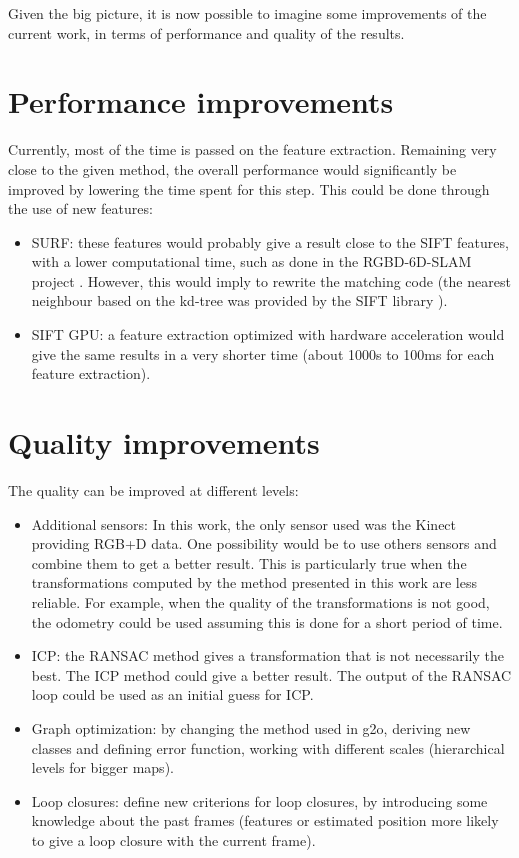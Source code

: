 Given the big picture, it is now possible to imagine some improvements of the current work, in terms of performance and quality of the results.

\section{Performance improvements}

Currently, most of the time is passed on the feature extraction. Remaining very close to the given method, the overall performance would significantly be improved by lowering the time spent for this step. This could be done through the use of new features:
\begin{itemize}
\item SURF: these features would probably give a result close to the SIFT features, with a lower computational time, such as done in the RGBD-6D-SLAM project \cite{engelhard11euron-workshop}. However, this would imply to rewrite the matching code (the nearest neighbour based on the kd-tree was provided by the SIFT library \cite{hess_sift}).
\item SIFT GPU: a feature extraction optimized with hardware acceleration would give the same results in a very shorter time (about 1000s to 100ms for each feature extraction).
\end{itemize}

\section{Quality improvements}

The quality can be improved at different levels:
\begin{itemize}
\item Additional sensors: In this work, the only sensor used was the Kinect providing RGB+D data. One possibility would be to use others sensors and combine them to get a better result. This is particularly true when the transformations computed by the method presented in this work are less reliable. For example, when the quality of the transformations is not good, the odometry could be used assuming this is done for a short period of time.
\item ICP: the RANSAC method gives a transformation that is not necessarily the best. The ICP method could give a better result. The output of the RANSAC loop could be used as an initial guess for ICP.
\item Graph optimization: by changing the method used in g2o, deriving new classes and defining error function, working with different scales (hierarchical levels for bigger maps).
\item Loop closures: define new criterions for loop closures, by introducing some knowledge about the past frames (features or estimated position more likely to give a loop closure with the current frame).
\end{itemize}

